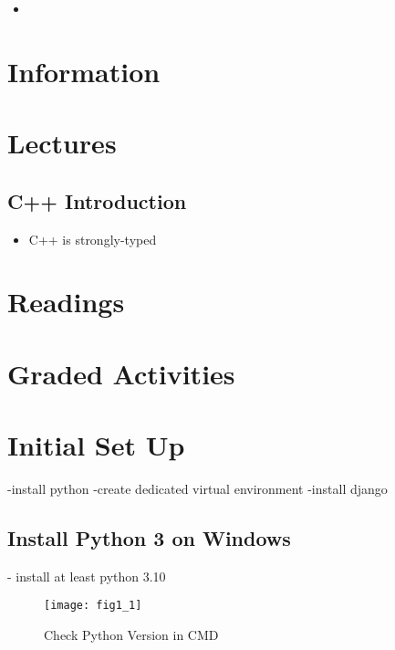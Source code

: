 \documentclass{article}
\begin{document}
\begin{itemize}
	\item 
\end{itemize}

\section{Information}






\section{Lectures}


\subsection{C++ Introduction}

\begin{itemize}
	\item C++ is strongly-typed
\end{itemize}



\section{Readings}




\section{Graded Activities}







\iffalse

\section{Initial Set Up}
-install python
-create dedicated virtual environment
-install django

\subsection{Install Python 3 on Windows}
- install at least python 3.10
\begin{figure}[H]
	\centering
	\texttt{[image: fig1\_1]}
	\caption {Check Python Version in CMD}
\end{figure}
\end{document}
